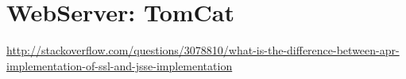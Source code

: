 \chapter{WebServer: TomCat}

\url{http://stackoverflow.com/questions/3078810/what-is-the-difference-between-apr-implementation-of-ssl-and-jsse-implementation}

